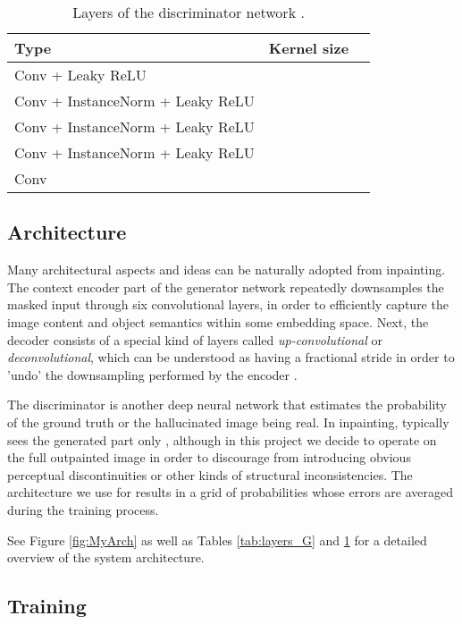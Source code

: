 \documentclass[twocolumn,showpacs,nofootinbib,aps,superscriptaddress,eqsecnum,prd,notitlepage,showkeys,10pt]{revtex4-1}
\begin{document}
\begin{table}[tp]
\centering
\footnotesize
\begin{tabular}{l c c}
  \hline
  Type & Kernel size &  \\ \hline\hline
  Conv + Leaky ReLU &  &  \\
  Conv + InstanceNorm + Leaky ReLU &  &  \\
  Conv + InstanceNorm + Leaky ReLU &  &  \\
  Conv + InstanceNorm + Leaky ReLU &  &  \\
  Conv &  &  \\ \hline
\end{tabular}
\caption{Layers of the discriminator network .}
\label{tab:layers_D}
\end{table}

\subsection{Architecture}

\hspace{\parindent} Many architectural aspects and ideas can be naturally adopted from inpainting. The context encoder part of the generator network  repeatedly downsamples the masked input through six convolutional layers, in order to efficiently capture the image content and object semantics within some embedding space. Next, the decoder consists of a special kind of layers called \textit{up-convolutional} or \textit{deconvolutional}, which can be understood as having a fractional stride in order to 'undo' the downsampling performed by the encoder \cite{Pathak2016}.

The discriminator  is another deep neural network that estimates the probability of the ground truth or the hallucinated image being real. In inpainting,  typically sees the generated part only \cite{Pathak2016}, although in this project we decide to operate on the full outpainted image in order to discourage  from introducing obvious perceptual discontinuities or other kinds of structural inconsistencies. The architecture we use for  results in a  grid of probabilities whose errors are averaged during the training process.

See Figure \ref{fig:MyArch} as well as Tables \ref{tab:layers_G} and \ref{tab:layers_D} for a detailed overview of the system architecture.

\subsection{Training}
\end{document}

